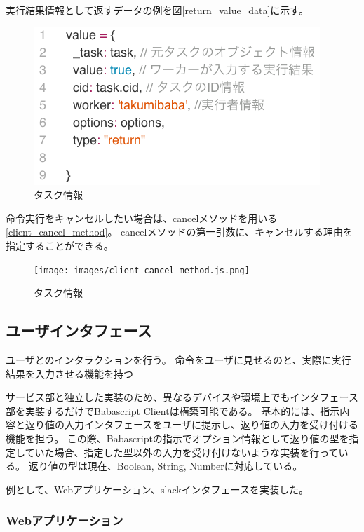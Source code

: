 実行結果情報として返すデータの例を図\ref{return_value_data}に示す。

\begin{figure}[htbp]
  \begin{center}
  \includegraphics[width=.6\linewidth,bb=0 0 408 225]{images/return_value_data.js.png}
  \end{center}
  \caption{タスク情報}
  \label{fig:return_value_data}
\end{figure}

命令実行をキャンセルしたい場合は、cancelメソッドを用いる\ref{client_cancel_method}。
cancelメソッドの第一引数に、キャンセルする理由を指定することができる。

\begin{figure}[htbp]
  \begin{center}
  \texttt{[image: images/client\_cancel\_method.js.png]}
  \end{center}
  \caption{タスク情報}
  \label{fig:client_cancel_method}
\end{figure}

\subsection{ユーザインタフェース}\label{ux30e6ux30fcux30b6ux30a4ux30f3ux30bfux30d5ux30a7ux30fcux30b9}

ユーザとのインタラクションを行う。
命令をユーザに見せるのと、実際に実行結果を入力させる機能を持つ

サービス部と独立した実装のため、異なるデバイスや環境上でもインタフェース部を実装するだけでBabascript
Clientは構築可能である。
基本的には、指示内容と返り値の入力インタフェースをユーザに提示し、返り値の入力を受け付ける機能を担う。
この際、Babascriptの指示でオプション情報として返り値の型を指定していた場合、指定した型以外の入力を受け付けないような実装を行っている。
返り値の型は現在、Boolean, String, Numberに対応している。

例として、Webアプリケーション、slackインタフェースを実装した。

\subsubsection{Webアプリケーション}\label{webux30a2ux30d7ux30eaux30b1ux30fcux30b7ux30e7ux30f3}

